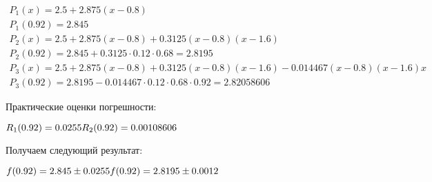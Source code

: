 \documentclass[a4paper,12pt]{report} %
\begin{document}
\begin{gather}
	P_1(x) = 2.5 + 2.875(x - 0.8) \\
	P_1(0.92) = 2.845 \\
	P_2(x) = 2.5 + 2.875(x - 0.8) + 0.3125(x - 0.8)(x-1.6) \\
	P_2(0.92) = 2.845 + 0.3125 \cdot 0.12 \cdot 0.68 = 2.8195 \\
	P_3(x) = 2.5 + 2.875(x - 0.8) + 0.3125(x - 0.8)(x-1.6) - 0.014467(x - 0.8)(x - 1.6)x \\
	P_3(0.92) = 2.8195 - 0.014467 \cdot 0.12 \cdot 0.68 \cdot 0.92 = 2.82058606
\end{gather}

Практические оценки погрешности:

\noindent
$
	R_1(0.92) = 0.0255 \\
	R_2(0.92) = 0.00108606
$

Получаем следующий результат:

\noindent
$
	f(0.92) = 2.845 \pm 0.0255 \\
	f(0.92) = 2.8195 \pm 0.0012
$
\end{document}
